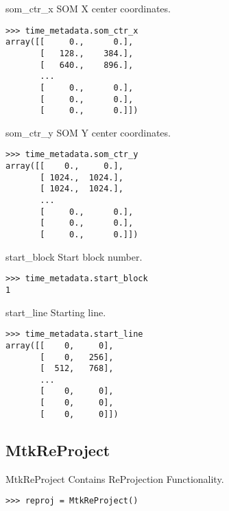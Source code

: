 \documentclass{howto}
\begin{document}
\begin{memberdesc}[double]{som_ctr_x}
  SOM X center coordinates.

\begin{verbatim}
>>> time_metadata.som_ctr_x
array([[     0.,      0.],
       [   128.,    384.],
       [   640.,    896.],
       ...
       [     0.,      0.],
       [     0.,      0.],
       [     0.,      0.]])
\end{verbatim}
\end{memberdesc}

\begin{memberdesc}[double]{som_ctr_y}
  SOM Y center coordinates.

\begin{verbatim}
>>> time_metadata.som_ctr_y
array([[    0.,     0.],
       [ 1024.,  1024.],
       [ 1024.,  1024.],
       ...
       [     0.,      0.],
       [     0.,      0.],
       [     0.,      0.]])
\end{verbatim}
\end{memberdesc}

\begin{memberdesc}[int]{start_block}
  Start block number.

\begin{verbatim}
>>> time_metadata.start_block
1
\end{verbatim}
\end{memberdesc}

\begin{memberdesc}[int]{start_line}
  Starting line.

\begin{verbatim}
>>> time_metadata.start_line 
array([[    0,     0],
       [    0,   256],
       [  512,   768],
       ...
       [    0,     0],
       [    0,     0],
       [    0,     0]])
\end{verbatim}
\end{memberdesc}


\subsection{MtkReProject \label{mtkreproject}}

\begin{classdesc*}{MtkReProject}
  Contains ReProjection Functionality.

\begin{verbatim}
>>> reproj = MtkReProject()
\end{verbatim}
\end{classdesc*}
\end{document}
